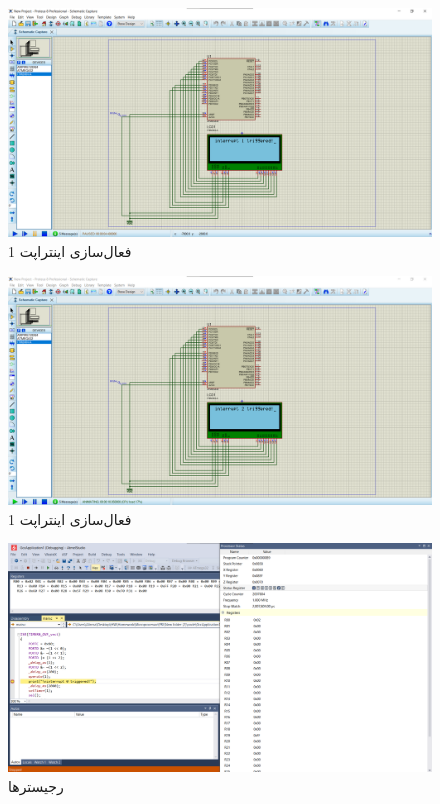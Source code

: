 \documentclass{article}
\begin{document}
\begin{figure}[H]
    \centering
    \includegraphics[width=1\textwidth]{figures/3.png}
    \caption
	{
فعال‌سازی اینتراپت 1
	}
    \label{fig:fig1}
\end{figure}
\begin{figure}[H]
    \centering
    \includegraphics[width=1\textwidth]{figures/4.png}
    \caption
	{
فعال‌سازی اینتراپت 1
	}
    \label{fig:fig1}
\end{figure}
\begin{figure}[H]
    \centering
    \includegraphics[width=1\textwidth]{figures/5.png}
    \caption
	{
رجیسترها
	}
    \label{fig:fig1}
\end{figure}
\end{document}
